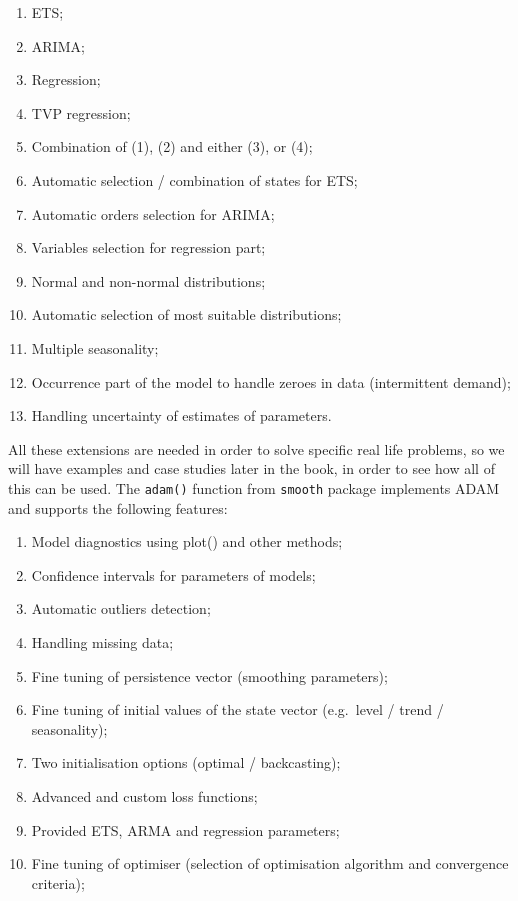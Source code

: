 \documentclass[
]{book}
\providecommand{\tightlist}{%
  \setlength{\itemsep}{0pt}\setlength{\parskip}{0pt}}
\theoremstyle{definition}
\theoremstyle{definition}
\theoremstyle{definition}
\theoremstyle{definition}
\theoremstyle{remark}
\begin{document}
\begin{enumerate}
\def\labelenumi{\arabic{enumi}.}
\tightlist
\item
  ETS;
\item
  ARIMA;
\item
  Regression;
\item
  TVP regression;
\item
  Combination of (1), (2) and either (3), or (4);
\item
  Automatic selection / combination of states for ETS;
\item
  Automatic orders selection for ARIMA;
\item
  Variables selection for regression part;
\item
  Normal and non-normal distributions;
\item
  Automatic selection of most suitable distributions;
\item
  Multiple seasonality;
\item
  Occurrence part of the model to handle zeroes in data (intermittent demand);
\item
  Handling uncertainty of estimates of parameters.
\end{enumerate}

All these extensions are needed in order to solve specific real life problems, so we will have examples and case studies later in the book, in order to see how all of this can be used. The \texttt{adam()} function from \texttt{smooth} package implements ADAM and supports the following features:

\begin{enumerate}
\def\labelenumi{\arabic{enumi}.}
\tightlist
\item
  Model diagnostics using plot() and other methods;
\item
  Confidence intervals for parameters of models;
\item
  Automatic outliers detection;
\item
  Handling missing data;
\item
  Fine tuning of persistence vector (smoothing parameters);
\item
  Fine tuning of initial values of the state vector (e.g.~level / trend / seasonality);
\item
  Two initialisation options (optimal / backcasting);
\item
  Advanced and custom loss functions;
\item
  Provided ETS, ARMA and regression parameters;
\item
  Fine tuning of optimiser (selection of optimisation algorithm and convergence criteria);
\end{enumerate}
\end{document}
